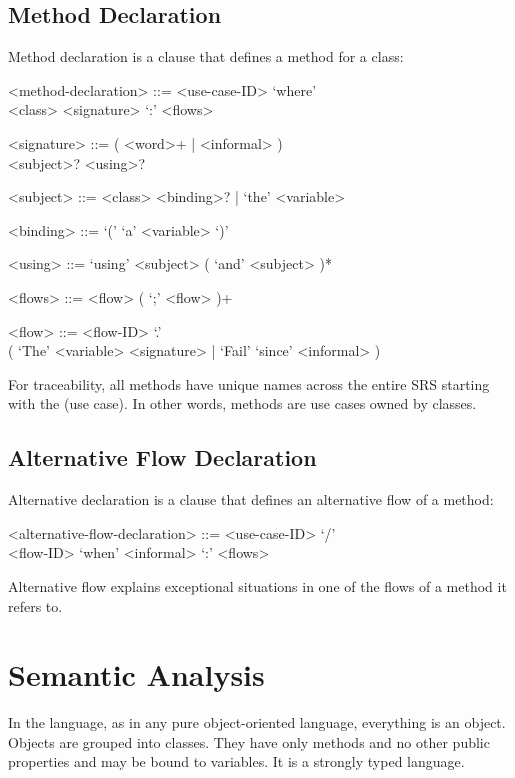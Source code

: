 \documentclass[sigplan,10pt,nonacm=true]{acmart}
\begin{document}
\subsection{Method Declaration}

Method declaration is a clause that defines a method for a class:

\begin{grammar}
<method-declaration> ::= <use-case-ID> `where' \\
<class> <signature> `:' <flows>

<signature> ::= ( <word>+ | <informal> ) \\
<subject>? <using>?

<subject> ::= <class> <binding>? | `the' <variable>

<binding> ::= `(' `a' <variable> `)'

<using> ::= `using' <subject> ( `and' <subject> )*

<flows> ::= <flow> ( `;' <flow> )+

<flow> ::= <flow-ID> `.' \\
( `The' <variable> <signature>
| `Fail' `since' <informal> )
\end{grammar}

For traceability, all methods have unique names across the entire
SRS starting with the  (use case). In other words,
methods are use cases owned by classes.

\subsection{Alternative Flow Declaration}

Alternative declaration is a clause that defines an alternative
flow of a method:

\begin{grammar}
<alternative-flow-declaration> ::= <use-case-ID> `/' \\
<flow-ID> `when' <informal> `:' <flows>
\end{grammar}

Alternative flow explains exceptional situations in one of the
flows of a method it refers to.

\section{Semantic Analysis}
\label{sec:semantic}

In the language, as in any pure object-oriented language, everything is
an object. Objects are grouped into classes. They have only methods
and no other public properties and may be bound to variables.
It is a strongly typed language.
\end{document}
